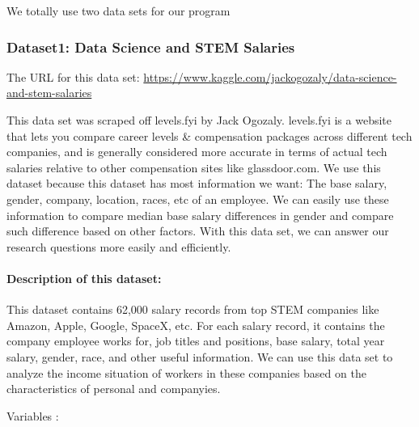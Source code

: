 \documentclass[
]{article}
\begin{document}
We totally use two data sets for our program

\hypertarget{dataset1-data-science-and-stem-salaries}{%
\subsubsection{Dataset1: Data Science and STEM
Salaries}\label{dataset1-data-science-and-stem-salaries}}

The URL for this data set:
\url{https://www.kaggle.com/jackogozaly/data-science-and-stem-salaries}

This data set was scraped off levels.fyi by Jack Ogozaly. levels.fyi is
a website that lets you compare career levels \& compensation packages
across different tech companies, and is generally considered more
accurate in terms of actual tech salaries relative to other compensation
sites like glassdoor.com. We use this dataset because this dataset has
most information we want: The base salary, gender, company, location,
races, etc of an employee. We can easily use these information to
compare median base salary differences in gender and compare such
difference based on other factors. With this data set, we can answer our
research questions more easily and efficiently.

\hypertarget{description-of-this-dataset}{%
\paragraph{Description of this
dataset:}\label{description-of-this-dataset}}

This dataset contains 62,000 salary records from top STEM companies like
Amazon, Apple, Google, SpaceX, etc. For each salary record, it contains
the company employee works for, job titles and positions, base salary,
total year salary, gender, race, and other useful information. We can
use this data set to analyze the income situation of workers in these
companies based on the characteristics of personal and companyies.

Variables :
\end{document}
